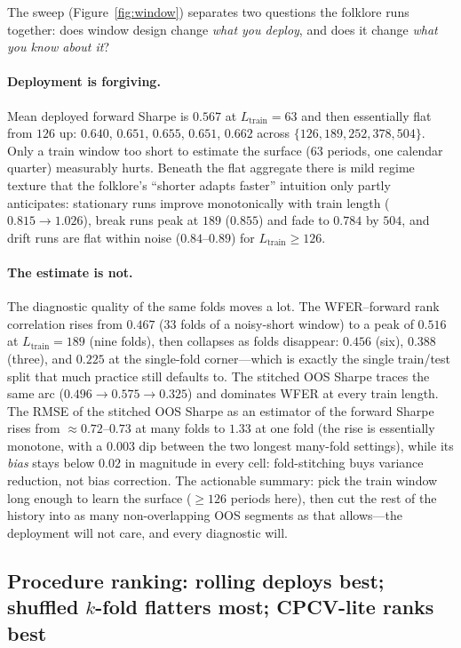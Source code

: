 \documentclass[11pt]{article}
\begin{document}
The sweep (Figure~\ref{fig:window}) separates two questions the folklore
runs together: does window design change \emph{what you deploy}, and does it
change \emph{what you know about it}?

\paragraph{Deployment is forgiving.} Mean deployed forward Sharpe is
$0.567$ at $L_{\mathrm{train}} = 63$ and then essentially flat from $126$
up: $0.640$, $0.651$, $0.655$, $0.651$, $0.662$ across
$\{126, 189, 252, 378, 504\}$. Only a train window too short to estimate the
surface ($63$ periods, one calendar quarter) measurably hurts. Beneath the
flat aggregate there is mild regime texture that the folklore's
``shorter adapts faster'' intuition only partly anticipates: stationary runs
improve monotonically with train length ($0.815 \to 1.026$), break runs peak
at $189$ ($0.855$) and fade to $0.784$ by $504$, and drift runs are flat
within noise ($0.84$--$0.89$) for $L_{\mathrm{train}} \ge 126$.

\paragraph{The estimate is not.} The diagnostic quality of the same folds
moves a lot. The WFER--forward rank correlation rises from $0.467$
($33$ folds of a noisy-short window) to a peak of $0.516$ at
$L_{\mathrm{train}} = 189$ (nine folds), then collapses as folds disappear:
$0.456$ (six), $0.388$ (three), and $0.225$ at the
single-fold corner---which is exactly the single train/test split that much
practice still defaults to. The stitched OOS Sharpe traces the same arc ($0.496 \to 0.575
\to 0.325$) and dominates WFER at every train length. The RMSE of the
stitched OOS Sharpe as an estimator of the forward Sharpe rises
from ${\approx}0.72$--$0.73$ at many folds to $1.33$ at one fold (the rise
is essentially monotone, with a $0.003$ dip between the two longest
many-fold settings), while its
\emph{bias} stays below $0.02$ in magnitude in every cell: fold-stitching
buys variance reduction, not bias correction. The actionable summary: pick
the train window long enough to learn the surface (${\ge}126$ periods here),
then cut the rest of the history into as many non-overlapping OOS segments
as that allows---the deployment will not care, and every diagnostic will.

\subsection{Procedure ranking: rolling deploys best; shuffled $k$-fold
flatters most; CPCV-lite ranks best}
\label{sec:ranking}
\end{document}
